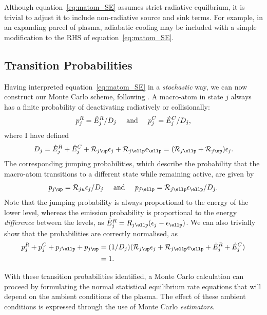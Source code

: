 Although equation~\ref{eq:matom_SE} assumes strict radiative equilbrium,
it is trivial to adjust it to include non-radiative source and sink terms. 
For example, in an expanding parcel of plasma, adiabatic cooling may be 
included with a simple modification to the RHS of equation~\ref{eq:matom_SE}.



\subsection{Transition Probabilities}

Having interpreted equation~\ref{eq:matom_SE} in a {\em stochastic} way,
we can now construct our Monte Carlo scheme, following \cite{lucy2002}.
A macro-atom in state $j$ always has a finite probability of deactivating
radiatively or collisionally:
\begin{equation}
p_{j}^{R} = \dot{E}_{j}^{R} / D_j \;\;\;\;\; {\rm and} \;\;\;
\;\; p_{j}^{C} = \dot{E}_{j}^{C} / D_j,
\label{eq:deactivate}
\end{equation}
where I have defined
\begin{equation}
D_j =  \dot{E}_{j}^{R}+\dot{E}_{j}^{C}+{\cal R}_{j\up}\epsilon_{j}+
 {\cal R}_{j \ellp}\epsilon_{\ellp} = ({\cal R}_{j\ellp} + {\cal R}_{j\up}) \epsilon_{j}.
\end{equation}
The corresponding jumping probabilities, which describe the probability
that the macro-atom transitions to a different state while remaining active, 
are given by
\begin{equation}
p_{j\up} = {\cal R}_{ju} \epsilon_{j} / D_j \;\;\;\;\; {\rm and} \;\;\;
\;\; p_{j\ellp} = {\cal R}_{j\ellp} \epsilon_{\ellp} / D_j.
\end{equation}
Note that the jumping probability is always proportional to the energy
of the lower level, whereas the emission probability is proportional
to the energy {\em difference} between the levels, as 
$\dot{E}_{j}^{R} = R_{j\ellp} (\epsilon_j - \epsilon_\ellp)$. We can also
trivially show that the probabilities are correctly normalised, as
\begin{align}
p_{j}^{R} + p_{j}^{C} + p_{j\ellp} + p_{j\up} &=
(1/D_j) ( {\cal R}_{j\up} \epsilon_{j} + {\cal R}_{j\ellp} \epsilon_{\ellp} +
\dot{E}_{j}^{R} + \dot{E}_{j}^{C}) \\
&= 1. \nonumber
\end{align}

With these transition
probabilities identified, a Monte Carlo calculation can proceed by formulating
the normal statistical equilibrium rate equations that will depend on
the ambient conditions of the plasma. The effect of these ambient conditions
is expressed through the use of Monte Carlo {\em estimators}.




